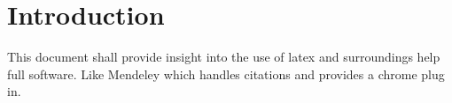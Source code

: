 \section{Introduction}
This document shall provide insight into the use of latex and surroundings help full software. Like Mendeley which handles citations and provides a chrome plug in.